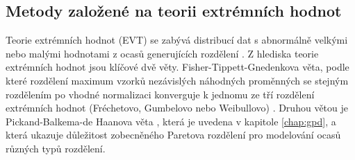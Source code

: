 \subsection{Metody založené na teorii extrémních hodnot}
Teorie extrémních hodnot (EVT) se zabývá distribucí dat s abnormálně velkými nebo malými hodnotami z ocasů generujících rozdělení \cite{evt1}. Z hlediska teorie extrémních hodnot jsou klíčové dvě věty. Fisher-Tippett-Gnedenkova věta, podle které rozdělení maximum vzorků nezávislých náhodných proměnných se stejným rozdělením po vhodné normalizaci konverguje k jednomu ze tří rozdělení extrémních hodnot (Fréchetovo, Gumbelovo nebo Weibullovo) \cite{evt2}. Druhou větou je Pickand-Balkema-de Haanova věta \cite{gpd5,gpd6}, která je uvedena v kapitole \ref{chap:gpd}, a která ukazuje důležitost zobecněného Paretova rozdělení pro modelování ocasů různých typů rozdělení.
\par 

